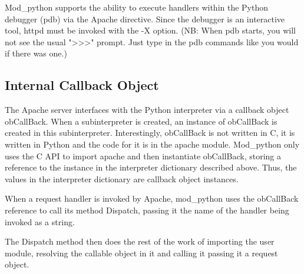 Mod_python supports the ability to execute handlers within the Python
debugger (pdb) via the  Apache directive. Since
the debugger is an interactive tool, httpd must be invoked with the -X
option. (NB: When pdb starts, you will not see the usual ">>>"
prompt. Just type in the pdb commands like you would if there was
one.)

\subsection{Internal Callback Object\label{pyapi-callback}}

The Apache server interfaces with the Python interpreter via a
callback object obCallBack. When a subinterpreter is created, an
instance of obCallBack is created in this
subinterpreter. Interestingly, obCallBack is not written in C, it is
written in Python and the code for it is in the apache module.
Mod_python only uses the C API to import apache and then instantiate
obCallBack, storing a reference to the instance in the interpreter
dictionary described above. Thus, the values in the interpreter
dictionary are callback object instances.

When a request handler is invoked by Apache, mod_python uses the
obCallBack reference to call its method Dispatch, passing it the name
of the handler being invoked as a string.
            
The Dispatch method then does the rest of the work of importing the
user module, resolving the callable object in it and calling it
passing it a request object.
